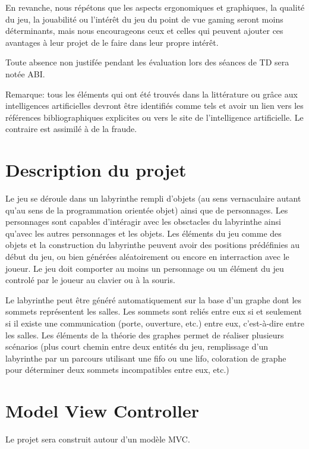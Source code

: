 \documentclass{article}
\begin{document}
En revanche, nous répétons que les aspects ergonomiques et graphiques, la qualité du jeu, la jouabilité ou l’intérêt du
jeu du point de vue 
gaming seront moins déterminants, mais nous encourageons ceux et celles qui peuvent ajouter ces avantages à leur projet de 
le faire dans leur propre intérêt.

Toute absence non justifée pendant les évaluation lors des séances de TD sera notée ABI.

Remarque: tous les éléments qui ont été trouvés dans la littérature ou grâce aux intelligences artificielles
devront être identifiés comme tels et avoir un lien vers les références
bibliographiques explicites ou vers le site de l'intelligence artificielle. Le contraire est assimilé à de la fraude.

\section*{Description du projet}

Le jeu se déroule dans un labyrinthe rempli d'objets (au sens vernaculaire autant qu'au sens de la programmation orientée objet)
ainsi que de personnages.
Les personnages sont capables d'intéragir avec les obsctacles du labyrinthe ainsi qu'avec les autres personnages et les objets. 
Les éléments du jeu comme des objets et la construction du labyrinthe peuvent avoir des positions prédéfinies au début du jeu,
ou bien générées aléatoirement ou encore en interraction avec le joueur.
Le jeu doit comporter au moins un personnage ou un élément du jeu controlé par le joueur au clavier ou à la souris.

Le labyrinthe peut être généré automatiquement sur la base d'un graphe dont les sommets représentent les salles.
Les sommets sont reliés entre eux si et seulement si il existe une communication (porte, ouverture, etc.) entre eux, c'est-à-dire
entre les salles.
Les éléments de la théorie des graphes permet de réaliser plusieurs scénarios (plus court chemin entre deux entités du jeu, 
remplissage d'un labyrinthe par un parcours utilisant une fifo ou une lifo, coloration de graphe pour déterminer deux sommets 
incompatibles entre eux, etc.)

\section*{Model View Controller}

Le projet sera construit autour d'un modèle MVC.
\end{document}
